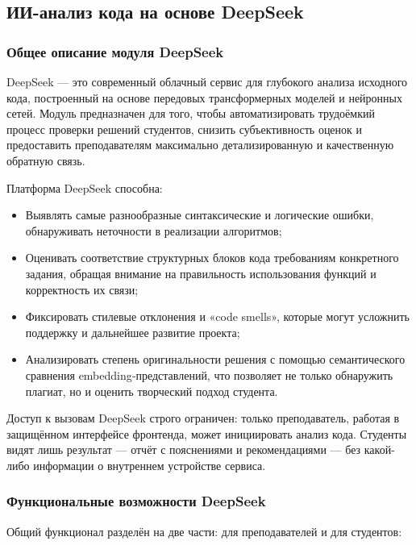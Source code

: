 \subsection{ИИ-анализ кода на основе DeepSeek}

\subsubsection{Общее описание модуля DeepSeek}

DeepSeek — это современный облачный сервис для глубокого анализа исходного кода, построенный на основе передовых трансформерных моделей и нейронных сетей\cite{deepseek_docs}. Модуль предназначен для того, чтобы автоматизировать трудоёмкий процесс проверки решений студентов, снизить субъективность оценок и предоставить преподавателям максимально детализированную и качественную обратную связь.

Платформа DeepSeek способна:

\begin{itemize}
  \item Выявлять самые разнообразные синтаксические и логические ошибки, обнаруживать неточности в реализации алгоритмов;
  \item Оценивать соответствие структурных блоков кода требованиям конкретного задания, обращая внимание на правильность использования функций и корректность их связи;
  \item Фиксировать стилевые отклонения и «code smells», которые могут усложнить поддержку и дальнейшее развитие проекта;
  \item Анализировать степень оригинальности решения с помощью семантического сравнения embedding‐представлений, что позволяет не только обнаружить плагиат, но и оценить творческий подход студента.
\end{itemize}

Доступ к вызовам DeepSeek строго ограничен: только преподаватель, работая в защищённом интерфейсе фронтенда, может инициировать анализ кода. Студенты видят лишь результат — отчёт с пояснениями и рекомендациями — без какой-либо информации о внутреннем устройстве сервиса.

\subsubsection{Функциональные возможности DeepSeek}

Общий функционал разделён на две части: для преподавателей и для студентов:

